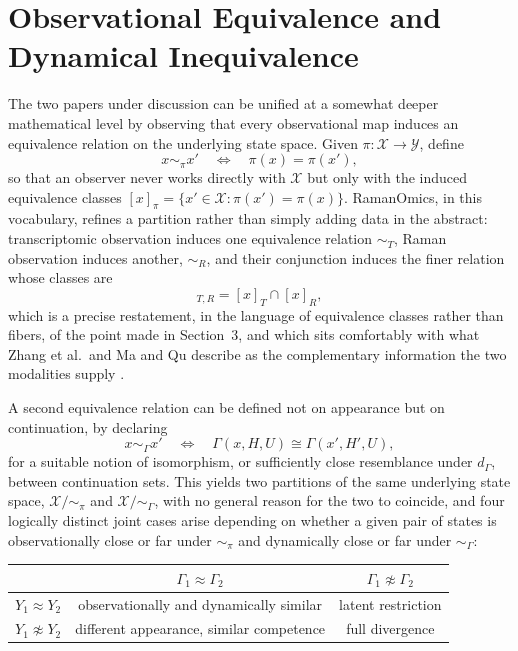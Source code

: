 \documentclass[11pt]{article}
\begin{document}
\section{Observational Equivalence and Dynamical Inequivalence}

The two papers under discussion can be unified at a somewhat deeper mathematical level by observing that every observational map induces an equivalence relation on the underlying state space. Given $\pi : \mathcal{X} \to \mathcal{Y}$, define
\begin{equation}
x \sim_\pi x' \quad \Longleftrightarrow \quad \pi(x) = \pi(x'),
\end{equation}
so that an observer never works directly with $\mathcal{X}$ but only with the induced equivalence classes $[x]_\pi = \{x' \in \mathcal{X} : \pi(x') = \pi(x)\}$. RamanOmics, in this vocabulary, refines a partition rather than simply adding data in the abstract: transcriptomic observation induces one equivalence relation $\sim_T$, Raman observation induces another, $\sim_R$, and their conjunction induces the finer relation whose classes are
\begin{equation}
[x]_{T,R} = [x]_T \cap [x]_R,
\end{equation}
which is a precise restatement, in the language of equivalence classes rather than fibers, of the point made in Section~3, and which sits comfortably with what Zhang et al.\ and Ma and Qu describe as the complementary information the two modalities supply \cite{zhang2026,maqu2026}.

A second equivalence relation can be defined not on appearance but on continuation, by declaring
\begin{equation}
x \sim_\Gamma x' \quad \Longleftrightarrow \quad \Gamma(x, H, U) \cong \Gamma(x', H', U),
\end{equation}
for a suitable notion of isomorphism, or sufficiently close resemblance under $d_\Gamma$, between continuation sets. This yields two partitions of the same underlying state space, $\mathcal{X}/{\sim_\pi}$ and $\mathcal{X}/{\sim_\Gamma}$, with no general reason for the two to coincide, and four logically distinct joint cases arise depending on whether a given pair of states is observationally close or far under $\sim_\pi$ and dynamically close or far under $\sim_\Gamma$:

\begin{center}
\begin{tabular}{l|cc}
 & $\Gamma_1 \approx \Gamma_2$ & $\Gamma_1 \not\approx \Gamma_2$ \\
\hline
$Y_1 \approx Y_2$ & observationally and dynamically similar & latent restriction \\
$Y_1 \not\approx Y_2$ & different appearance, similar competence & full divergence
\end{tabular}
\end{center}
\end{document}
